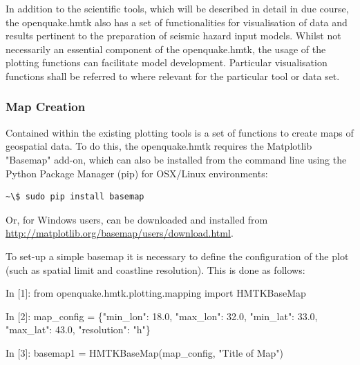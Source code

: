 In addition to the scientific tools, which will be described in detail in due course, the openquake.hmtk also has a set of functionalities for visualisation of data and results pertinent to the preparation of seismic hazard input models. Whilst not necessarily an essential component of the openquake.hmtk, the usage of the plotting functions can facilitate model development. Particular visualisation functions shall be referred to where relevant for the particular tool or data set. 

\subsubsection{Map Creation}

Contained within the existing plotting tools is a set of functions to create maps of geospatial data. To do this, the openquake.hmtk requires the Matplotlib "Basemap" add-on, which can also be installed from the command line using the Python Package Manager (pip) for OSX/Linux environments:

\begin{Verbatim}[frame=single, commandchars=\\\{\}, fontsize=\scriptsize]
~\$ sudo pip install basemap
\end{Verbatim}   

Or, for Windows users, can be downloaded and installed from\\ \href{http://matplotlib.org/basemap/users/download.html}{http://matplotlib.org/basemap/users/download.html}. 

To set-up a simple basemap it is necessary to define the configuration of the plot (such as spatial limit and coastline resolution). This is done as follows:

\begin{python}[frame=single]
In [1]: from openquake.hmtk.plotting.mapping import HMTKBaseMap

In [2]: map_config = \{"min_lon": 18.0,
                       "max_lon": 32.0,
                       "min_lat": 33.0,
                       "max_lat": 43.0,
                       "resolution": "h"\}

In [3]: basemap1 = HMTKBaseMap(map_config, "Title of Map")
\end{python}


